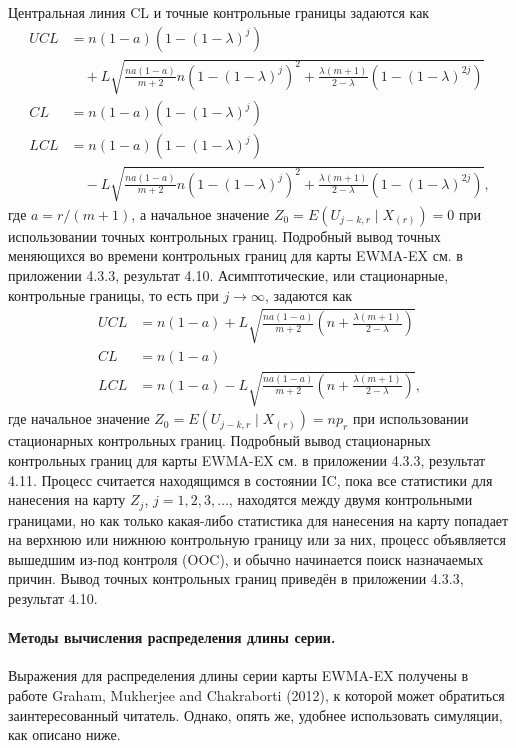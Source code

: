 Центральная линия CL и точные контрольные границы задаются как
\begin{equation}
\begin{aligned}
	UCL &= n(1 - a)\left( 1 - (1 - \lambda)^j \right) \\
	    &\quad + L\sqrt{\frac{na(1 - a)}{m + 2}n\left( 1 - (1 - \lambda)^j \right)^2 + \frac{\lambda(m + 1)}{2 - \lambda}\left( 1 - (1 - \lambda)^{2j} \right)} \\
	CL &= n(1 - a)\left( 1 - (1 - \lambda)^j \right) \\
	LCL &= n(1 - a)\left( 1 - (1 - \lambda)^j \right) \\
	    &\quad - L\sqrt{\frac{na(1 - a)}{m + 2}n\left( 1 - (1 - \lambda)^j \right)^2 + \frac{\lambda(m + 1)}{2 - \lambda}\left( 1 - (1 - \lambda)^{2j} \right)},
\end{aligned}
\label{eq:4.59}
\end{equation}
где \(a = r/(m + 1)\), а начальное значение \(Z_0 = E\left( U_{j-k,r} \mid X_{(r)} \right) = 0\) при использовании точных контрольных границ. Подробный вывод точных меняющихся во времени контрольных границ для карты EWMA-EX см. в приложении 4.3.3, результат 4.10. Асимптотические, или стационарные, контрольные границы, то есть при \(j \to \infty\), задаются как
\begin{equation}
\begin{aligned}
	UCL &= n(1 - a) + L\sqrt{\frac{na(1 - a)}{m + 2}\left( n + \frac{\lambda(m + 1)}{2 - \lambda} \right)} \\
	CL &= n(1 - a) \\
	LCL &= n(1 - a) - L\sqrt{\frac{na(1 - a)}{m + 2}\left( n + \frac{\lambda(m + 1)}{2 - \lambda} \right)},
\end{aligned}
\label{eq:4.60}
\end{equation}
где начальное значение \(Z_0 = E\left( U_{j-k,r} \mid X_{(r)} \right) = np_r\) при использовании стационарных контрольных границ. Подробный вывод стационарных контрольных границ для карты EWMA-EX см. в приложении 4.3.3, результат 4.11. Процесс считается находящимся в состоянии IC, пока все статистики для нанесения на карту \(Z_j\), \(j = 1, 2, 3, \ldots\), находятся между двумя контрольными границами, но как только какая-либо статистика для нанесения на карту попадает на верхнюю или нижнюю контрольную границу или за них, процесс объявляется вышедшим из-под контроля (OOC), и обычно начинается поиск назначаемых причин. Вывод точных контрольных границ приведён в приложении 4.3.3, результат 4.10.

\paragraph{Методы вычисления распределения длины серии.} Выражения для распределения длины серии карты EWMA-EX получены в работе Graham, Mukherjee and Chakraborti (2012), к которой может обратиться заинтересованный читатель. Однако, опять же, удобнее использовать симуляции, как описано ниже.

